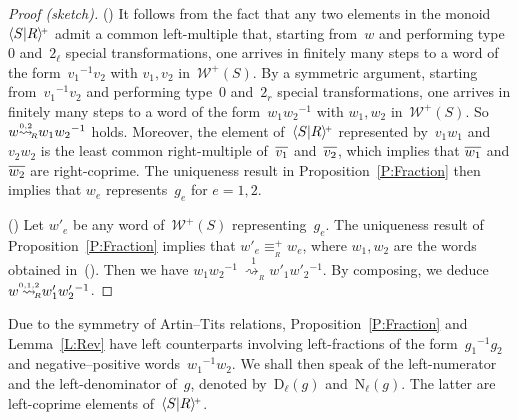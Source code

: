 \documentclass{amsart}
\numberwithin{equation}{section}
\theoremstyle{plain}
\theoremstyle{definition}
\newcounter{ITEM}
\begin{document}
\begin{proof}[Proof (sketch)]
{\setcounter{ITEM}{1}\leavevmode\hbox{\rm()}} It follows from the fact that any two elements in the monoid~${\langle{S}{\mid}\nobreak{R}\rangle^{\!\scriptscriptstyle+}}$ admit a common left-multiple that, starting from~${w}$ and performing type~$0$ and~$2_\ell$ special transformations, one arrives in finitely many steps to a word of the form~${v}_1{^{-1}} {v}_2$ with ${v}_1, {v}_2$ in~${\mathcal{W}^{\scriptscriptstyle+}\!({S})}$. By a symmetric argument, starting from~${v}_1{^{-1}} {v}_2$ and performing type~$0$ and~$2_r$ special transformations, one arrives in finitely many steps to a word of the form~${w}_1 {w}_2{^{-1}}$ with ${w}_1, {w}_2$ in~${\mathcal{W}^{\scriptscriptstyle+}\!({S})}$. So ${w} {{\mathrel{\overset{\scriptscriptstyle 0,2}{\rightsquigarrow}}}_{\hspace{-0.4ex}{\scriptscriptstyle R}}} {w}_1 {w}_2{^{-1}}$ holds. Moreover, the element of~${\langle{S}{\mid}\nobreak{R}\rangle^{\!\scriptscriptstyle+}}$ represented by~${v}_1 {w}_1$ and~${v}_2 {w}_2$ is the least common right-multiple of~${\overline{\vrule width0pt height5pt{{v}_1}}}$ and~${\overline{\vrule width0pt height5pt{{v}_2}}}$, which implies that ${\overline{\vrule width0pt height5pt{{w}_1}}}$ and ${\overline{\vrule width0pt height5pt{{w}_2}}}$ are right-coprime. The uniqueness result in Proposition~\ref{P:Fraction} then implies that ${w}_{e}$ represents~${g}_{e}$ for ${e} = 1, 2$.

{\setcounter{ITEM}{2}\leavevmode\hbox{\rm()}} Let ${w}'_{e}$ be any word of~${\mathcal{W}^{\scriptscriptstyle+}\!({S})}$ representing~${g}_{e}$. The uniqueness result of Proposition~\ref{P:Fraction} implies that ${w}'_{e} {\equiv_{{\!{}_{R}}}^{\scriptscriptstyle+}} {w}_{e}$, where ${w}_1, {w}_2$ are the words obtained in~{\setcounter{ITEM}{1}\leavevmode\hbox{\rm()}}. Then we have ${w}_1 {w}_2{^{-1}} {\mathrel{\overset{1}{\ \rightsquigarrow_{{\!{}_{R}}}}}} {w}'_1 {w}'_2{}{^{-1}}$. By composing, we deduce ${w} {\mathrel{{\mathrel{\overset{\scriptscriptstyle 0,1,2}{\rightsquigarrow}}}_{\hspace{-0.9ex}{\scriptscriptstyle R}}}} {w}'_1 {w}'_2{}{^{-1}}$.
\end{proof}

Due to the symmetry of Artin--Tits relations, Proposition~\ref{P:Fraction} and Lemma~\ref{L:Rev} have left counterparts involving left-fractions of the form~${g}_1{^{-1}} {g}_2$ and negative--positive words~${w}_1{^{-1}} {w}_2$. We shall then speak of the left-numerator and the left-denominator of~${g}$, denoted by~${{\scriptstyle\mathrm{D}}{_{\ell}}({g})}$ and~${{\scriptstyle\mathrm{N}}{_{\ell}}({g})}$. The latter are left-coprime elements of~${\langle{S}{\mid}\nobreak{R}\rangle^{\!\scriptscriptstyle+}}$.
\end{document}
